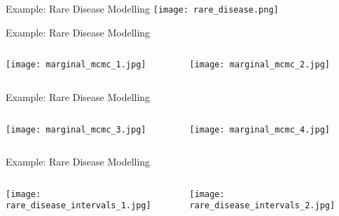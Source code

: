 \begin{frame}{Example: Rare Disease Modelling}
	\centering
	\texttt{[image: rare\_disease.png]}
\end{frame}

\begin{frame}{Example: Rare Disease Modelling}
	\begin{columns}
		\begin{column}{0.5\textwidth}
			\centering
			\texttt{[image: marginal\_mcmc\_1.jpg]}
		\end{column}
		\begin{column}{0.5\textwidth}
			\centering
			\texttt{[image: marginal\_mcmc\_2.jpg]}
		\end{column}
	\end{columns}
\end{frame}

\begin{frame}{Example: Rare Disease Modelling}
	\begin{columns}
		\begin{column}{0.5\textwidth}
			\centering
			\texttt{[image: marginal\_mcmc\_3.jpg]}
		\end{column}
		\begin{column}{0.5\textwidth}
			\centering
			\texttt{[image: marginal\_mcmc\_4.jpg]}
		\end{column}
	\end{columns}
\end{frame}

\begin{frame}{Example: Rare Disease Modelling}
	\begin{columns}
		\begin{column}{0.5\textwidth}
			\centering
			\texttt{[image: rare\_disease\_intervals\_1.jpg]}
		\end{column}
		\begin{column}{0.5\textwidth}
			\centering
			\texttt{[image: rare\_disease\_intervals\_2.jpg]}
		\end{column}
	\end{columns}
\end{frame}
